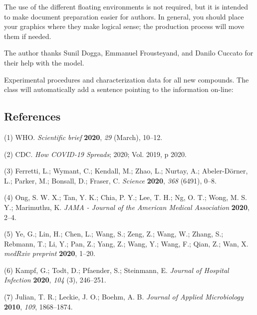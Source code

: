 \documentclass[journal=jacsat,manuscript=article]{achemso}
\begin{document}
The use of the different floating environments is not required, but it
is intended to make document preparation easier for authors. In general,
you should place your graphics where they make logical sense; the
production process will move them if needed.

\begin{acknowledgement}
The author thanks Sunil Dogga, Emmanuel Frousteyand, and Danilo Cuccato for their help with the model. 
\end{acknowledgement}

\begin{suppinfo}
Experimental procedures and
characterization data for all new compounds. The class will
automatically add a sentence pointing to the information on-line:
\end{suppinfo}

\hypertarget{references}{%
\subsection*{References}\label{references}}

\hypertarget{refs}{}
\leavevmode\hypertarget{ref-WHO2020}{}%
(1) WHO. \emph{Scientific brief} \textbf{2020}, \emph{29} (March),
10--12.

\leavevmode\hypertarget{ref-CDC2020}{}%
(2) CDC. \emph{How COVID-19 Spreads}; 2020; Vol. 2019, p 2020.

\leavevmode\hypertarget{ref-Ferretti2020}{}%
(3) Ferretti, L.; Wymant, C.; Kendall, M.; Zhao, L.; Nurtay, A.;
Abeler-Dörner, L.; Parker, M.; Bonsall, D.; Fraser, C. \emph{Science}
\textbf{2020}, \emph{368} (6491), 0--8.

\leavevmode\hypertarget{ref-Ong2020}{}%
(4) Ong, S. W. X.; Tan, Y. K.; Chia, P. Y.; Lee, T. H.; Ng, O. T.; Wong,
M. S. Y.; Marimuthu, K. \emph{JAMA - Journal of the American Medical
Association} \textbf{2020}, 2--4.

\leavevmode\hypertarget{ref-Ye2020}{}%
(5) Ye, G.; Lin, H.; Chen, L.; Wang, S.; Zeng, Z.; Wang, W.; Zhang, S.;
Rebmann, T.; Li, Y.; Pan, Z.; Yang, Z.; Wang, Y.; Wang, F.; Qian, Z.;
Wan, X. \emph{medRxiv preprint} \textbf{2020}, 1--20.

\leavevmode\hypertarget{ref-Kampf2020}{}%
(6) Kampf, G.; Todt, D.; Pfaender, S.; Steinmann, E. \emph{Journal of
Hospital Infection} \textbf{2020}, \emph{104} (3), 246--251.

\leavevmode\hypertarget{ref-Julian2010}{}%
(7) Julian, T. R.; Leckie, J. O.; Boehm, A. B. \emph{Journal of Applied
Microbiology} \textbf{2010}, \emph{109}, 1868--1874.
\end{document}
